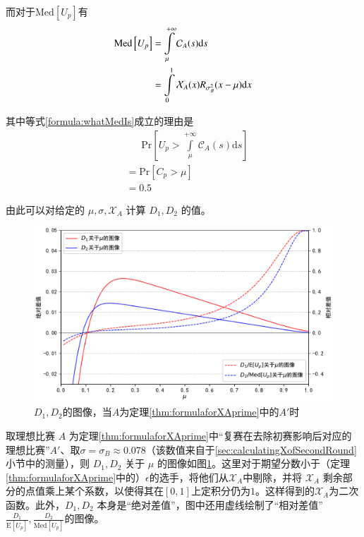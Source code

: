            而对于$\mathrm{Med}\left[U_p\right]$有
            \begin{align}
                \mathrm{Med}\left[U_p\right]
                &=\int\limits_{\mu}^{+\infty} \mathcal{C}_A(s)\mathrm{d}s \label{formula:whatMedIs}\\
                &=\int\limits_0^1 \mathcal{X}_A(x)R_{\sigma_B^2}(x-\mu) \mathrm{d}x \notag
            \end{align}

            其中等式\eqref{formula:whatMedIs}成立的理由是
            \begin{align*}
            &\phantom{=\ }\mathrm{Pr}\left[U_p>\int\limits_{\mu}^{+\infty} \mathcal{C}_A(s)\mathrm{d}s\right] \\
            &=\mathrm{Pr}\left[C_p>\mu\right] \\
            &=0.5
            \end{align*}

            由此可以对给定的 $\mu,\sigma,\mathcal{X}_A$ 计算 $D_1,D_2$ 的值。

            \vspace{1.5ex}

            \begin{figure}[htbp]
                \centering
                \includegraphics[width=\textwidth]{fig/plottingD_1D_2.pdf}
                \caption{$D_1,D_2$的图像，当$A$为定理\ref{thm:formulaforXAprime}中的$A'$时}
                \label{fig:plottingD_1D_2forAprime}
            \end{figure}

            取理想比赛 $A$ 为定理\ref{thm:formulaforXAprime}中“复赛在去除初赛影响后对应的理想比赛”$A'$、取$\sigma=\sigma_B\approx 0.078$（该数值来自于\ref{sec:calculatingXofSecondRound}小节中的测量），则 $D_1,D_2$ 关于 $\mu$ 的图像如图\ref{fig:plottingD_1D_2forAprime}。这里对于期望分数小于（定理\ref{thm:formulaforXAprime}中的）$\epsilon$的选手，将他们从$\mathcal{X}_A$中剔除，并将 $\mathcal{X}_A$ 剩余部分的点值乘上某个系数，以使得其在$[0,1]$上定积分仍为$1$。这样得到的$\mathcal{X}_A$为二次函数。此外，$D_1,D_2$ 本身是“绝对差值”，图中还用虚线绘制了“相对差值”$\frac{D_1}{\mathrm{E}\left[U_p\right]},\frac{D_2}{\mathrm{Med}\left[U_p\right]}$的图像。

